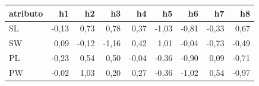 
\begin{tabular}{lrrrrrrrr}
\toprule
\textbf{atributo} & \textbf{h1} & \textbf{h2} & \textbf{h3} & \textbf{h4} & \textbf{h5} & \textbf{h6} & \textbf{h7} & \textbf{h8} \\
\midrule
SL & -0{,}13 & 0{,}73 & 0{,}78 & 0{,}37 & -1{,}03 & -0{,}81 & -0{,}33 & 0{,}67 \\
SW & 0{,}09 & -0{,}12 & -1{,}16 & 0{,}42 & 1{,}01 & -0{,}04 & -0{,}73 & -0{,}49 \\
PL & -0{,}23 & 0{,}54 & 0{,}50 & -0{,}04 & -0{,}36 & -0{,}90 & 0{,}09 & -0{,}71 \\
PW & -0{,}02 & 1{,}03 & 0{,}20 & 0{,}27 & -0{,}36 & -1{,}02 & 0{,}54 & -0{,}97 \\
\bottomrule
\end{tabular}
